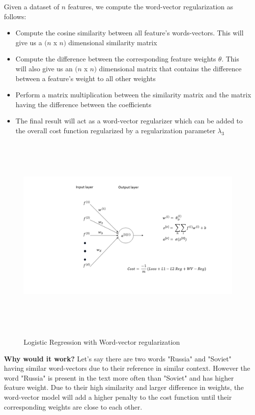 \noindent Given a dataset of $n$ features, we compute the word-vector regularization as follows:

\begin{itemize}
\item Compute the cosine similarity between all feature's words-vectors. This will give us a $(n$ x $n)$ dimensional similarity matrix
\item Compute the difference between the corresponding feature weights $\theta$. This will also give us an $(n$ x $n)$ dimensional matrix that contains the difference between a feature's weight to all other weights
\item Perform a matrix multiplication between the similarity matrix and the matrix having the difference between the coefficients
\item The final result will act as a word-vector regularizer which can be added to the overall cost function regularized by a regularization parameter $\lambda_{3}$

\end{itemize}

\begin{figure}[htbp]
\centering
\includegraphics[width=16cm, height=10cm]{images/model3.png}\\
\centering
\caption{Logistic Regression with Word-vector regularization}
\label{fig:foo}
\end{figure}

\textbf{Why would it work?}
Let's say there are two words "Russia" and "Soviet" having similar word-vectors due to their reference in similar context. However the word "Russia" is present in the text more often than "Soviet" and has higher feature weight. Due to their high similarity and larger difference in weights, the word-vector model will add a higher penalty to the cost function until their corresponding weights are close to each other.

